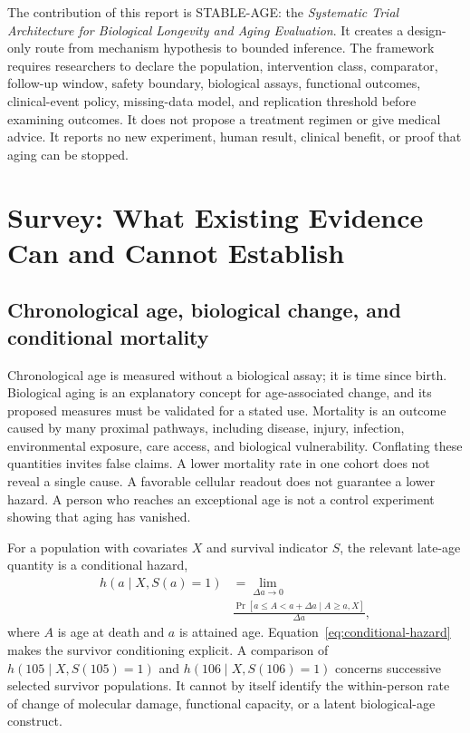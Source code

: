 \documentclass[10pt,conference]{IEEEtran}
\begin{document}
The contribution of this report is STABLE-AGE: the \emph{Systematic Trial Architecture for Biological Longevity and Aging Evaluation}. It creates a design-only route from mechanism hypothesis to bounded inference. The framework requires researchers to declare the population, intervention class, comparator, follow-up window, safety boundary, biological assays, functional outcomes, clinical-event policy, missing-data model, and replication threshold before examining outcomes. It does not propose a treatment regimen or give medical advice. It reports no new experiment, human result, clinical benefit, or proof that aging can be stopped.

\section{Survey: What Existing Evidence Can and Cannot Establish}
\label{sec:survey}

\subsection{Chronological age, biological change, and conditional mortality}

Chronological age is measured without a biological assay; it is time since birth. Biological aging is an explanatory concept for age-associated change, and its proposed measures must be validated for a stated use. Mortality is an outcome caused by many proximal pathways, including disease, injury, infection, environmental exposure, care access, and biological vulnerability. Conflating these quantities invites false claims. A lower mortality rate in one cohort does not reveal a single cause. A favorable cellular readout does not guarantee a lower hazard. A person who reaches an exceptional age is not a control experiment showing that aging has vanished.

For a population with covariates $X$ and survival indicator $S$, the relevant late-age quantity is a conditional hazard,
\begin{align}
h(a\mid X,S(a)=1)&=\lim_{\Delta a\rightarrow 0} \nonumber\\
&\frac{\Pr[a\leq A<a+\Delta a\mid A\geq a,X]}{\Delta a},
\label{eq:conditional-hazard}
\end{align}
where $A$ is age at death and $a$ is attained age. Equation~\eqref{eq:conditional-hazard} makes the survivor conditioning explicit. A comparison of $h(105\mid X,S(105)=1)$ and $h(106\mid X,S(106)=1)$ concerns successive selected survivor populations. It cannot by itself identify the within-person rate of change of molecular damage, functional capacity, or a latent biological-age construct.
\end{document}
